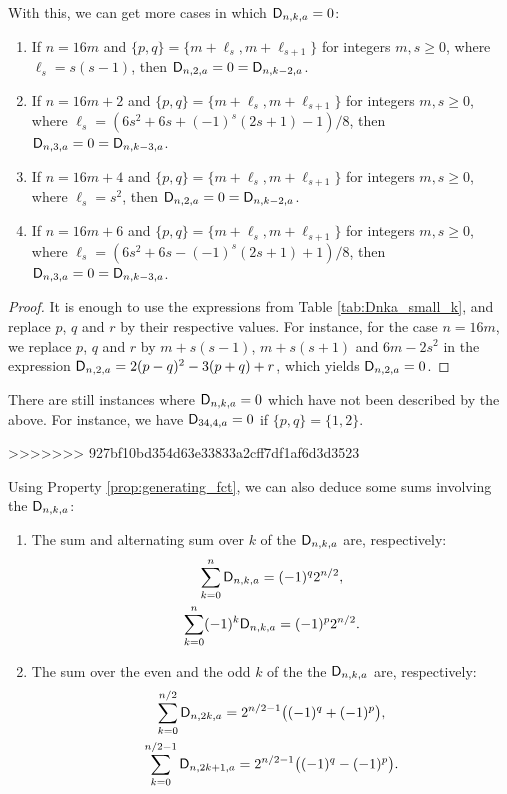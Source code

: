 \documentclass[11pt]{llncs}
\begin{document}
With this, we can get more cases in which $\mathsf{D}_{n,k,a}=0$:

\begin{Prop}\mbox{}
    \begin{enumerate}
        \item If $n=16m$ and $\{p,q\}=\{m+\ell_s,m+\ell_{s+1}\}$ for integers $m,s\geq 0$, where $\ell_s=s(s-1)$, then $\mathsf{D}_{n,2,a}=0=\mathsf{D}_{n,k-2,a}$.
        \item If $n=16m+2$ and $\{p,q\}=\{m+\ell_s,m+\ell_{s+1}\}$ for integers $m,s\geq 0$, where $\ell_s=\left(6s^2+6s+(-1)^s(2s+1)-1\right)/8$, then $\mathsf{D}_{n,3,a}=0=\mathsf{D}_{n,k-3,a}$.
        \item If $n=16m+4$ and $\{p,q\}=\{m+\ell_s,m+\ell_{s+1}\}$ for integers $m,s\geq 0$, where $\ell_s=s^2$, then $\mathsf{D}_{n,2,a}=0=\mathsf{D}_{n,k-2,a}$.
        \item If $n=16m+6$ and $\{p,q\}=\{m+\ell_s,m+\ell_{s+1}\}$ for integers $m,s\geq 0$, where $\ell_s=\left(6s^2+6s-(-1)^s(2s+1)+1\right)/8$, then $\mathsf{D}_{n,3,a}=0=\mathsf{D}_{n,k-3,a}$.
    \end{enumerate}
\end{Prop}

\begin{proof}
    It is enough to use the expressions from Table \ref{tab:Dnka_small_k}, and replace $p$, $q$ and $r$ by their respective values. For instance, for the case $n=16m$, we replace $p$, $q$ and $r$ by $m+s(s-1)$, $m+s(s+1)$ and $6m-2s^2$ in the expression $\mathsf{D}_{n,2,a}=2(p-q)^2-3(p+q)+r$, which yields $\mathsf{D}_{n,2,a}=0$.
\end{proof}

\begin{remark}
    There are still instances where $\mathsf{D}_{n,k,a}=0$ which have not been described by the above. For instance, we have $\mathsf{D}_{34,4,a}=0$ if $\{p,q\}=\{1,2\}$.
\end{remark}
>>>>>>> 927bf10bd354d63e33833a2cff7df1af6d3d3523

Using Property \ref{prop:generating_fct}, we can also deduce some sums involving the $\mathsf{D}_{n,k,a}$:

\begin{Prop}\mbox{}
    \begin{enumerate}
        \item The sum and alternating sum over $k$ of the $\mathsf{D}_{n,k,a}$ are, respectively:
        \begin{gather*}
            \sum_{k=0}^n\mathsf{D}_{n,k,a}=(-1)^{q}2^{n/2},\\
            \sum_{k=0}^n(-1)^k\mathsf{D}_{n,k,a}=(-1)^{p}2^{n/2}.
        \end{gather*}
        \item The sum over the even and the odd $k$ of the the $\mathsf{D}_{n,k,a}$ are, respectively:
        \begin{gather*}
            \sum_{k=0}^{n/2}\mathsf{D}_{n,2k,a}=2^{n/2-1}\big((-1)^{q}+(-1)^{p}\big),\\
            \sum_{k=0}^{n/2-1}\mathsf{D}_{n,2k+1,a}=2^{n/2-1}\big((-1)^{q}-(-1)^{p}\big).
        \end{gather*}
    \end{enumerate}

\end{Prop}
\end{document}
